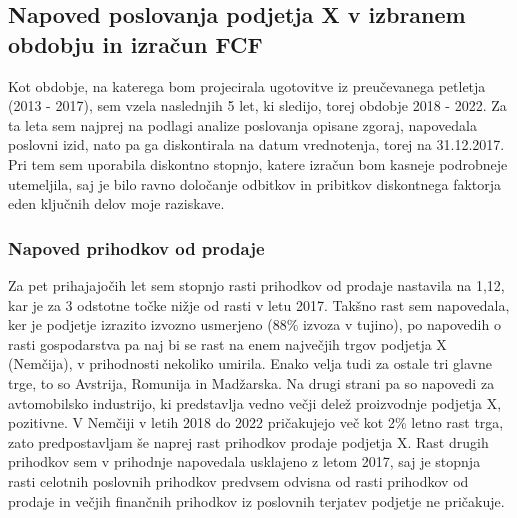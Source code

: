 \documentclass[12pt,a4paper]{amsart}
\theoremstyle{definition} %
\theoremstyle{plain} %
\begin{document}


\subsection{Napoved poslovanja podjetja X v izbranem obdobju in izračun FCF}

Kot obdobje, na katerega bom projecirala ugotovitve iz preučevanega petletja (2013 - 2017), sem vzela naslednjih 5 let, ki sledijo, torej obdobje 2018 - 2022. Za ta leta sem najprej na podlagi analize poslovanja opisane zgoraj, napovedala poslovni izid, nato pa ga diskontirala na datum vrednotenja, torej na 31.12.2017. Pri tem sem uporabila diskontno stopnjo, katere izračun bom kasneje podrobneje utemeljila, saj je bilo ravno določanje odbitkov in pribitkov diskontnega faktorja eden ključnih delov moje raziskave.

\subsubsection{Napoved prihodkov od prodaje}
Za pet prihajajočih let sem stopnjo rasti prihodkov od prodaje nastavila na 1,12, kar je za 3 odstotne točke nižje od rasti v letu 2017. Takšno rast sem napovedala, ker je podjetje izrazito izvozno usmerjeno (88\% izvoza v tujino), po napovedih o rasti gospodarstva pa naj bi se rast na enem največjih trgov podjetja X (Nemčija), v prihodnosti nekoliko umirila. Enako velja tudi za ostale tri glavne trge, to so Avstrija, Romunija in Madžarska. Na drugi strani pa so napovedi za avtomobilsko industrijo, ki predstavlja vedno večji delež proizvodnje podjetja X, pozitivne. V Nemčiji v letih 2018 do 2022 pričakujejo več kot 2\% letno rast trga, zato predpostavljam še naprej rast prihodkov prodaje podjetja X. Rast drugih prihodkov sem v prihodnje napovedala usklajeno z letom 2017, saj je stopnja rasti celotnih poslovnih prihodkov predvsem odvisna od rasti prihodkov od prodaje in večjih finančnih prihodkov iz poslovnih terjatev podjetje ne pričakuje.
\end{document}
